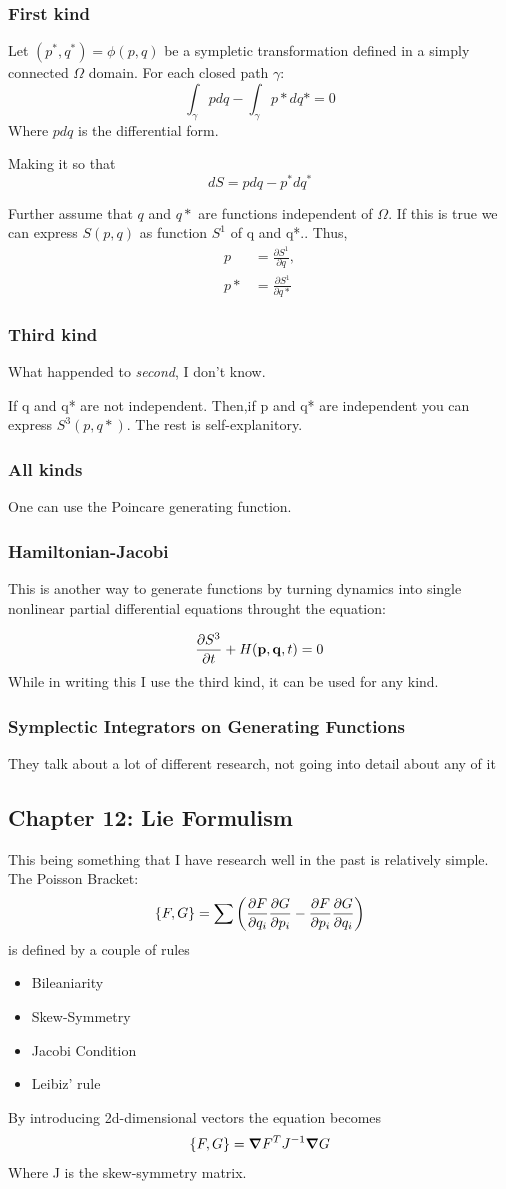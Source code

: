 \subsubsection{First kind}
Let $(p^*,q^*) = \phi(p, q)$ be a sympletic transformation defined in a simply connected $\Omega$ domain. For each closed path $\gamma$:
$$ \int_\gamma p dq-\int_\gamma p*dq* = 0$$
Where $pdq$ is the differential form.

Making it so that
$$ dS= pdq - p^*dq^* $$

Further assume that $q$ and $q*$ are functions independent of $\Omega$. If this is true we can express $S(p, q) $ as function $S^1$ of q and q*.. Thus,
\begin{align}
p &= \frac{\partial S^1}{\partial q}, \\
p* &= \frac{\partial S^1}{\partial q*}
\end{align} 

\subsubsection{Third kind}
What happended to \emph{second}, I don't know.

If q and q* are not independent. Then,if p and q* are independent you can express $S^3(p, q*)$. The rest is self-explanitory.

\subsubsection{All kinds}
One can use the Poincare generating function.
\subsubsection{Hamiltonian-Jacobi}
This is another way to generate functions by turning dynamics into single nonlinear partial differential equations throught the equation:

\[
\pdv{S^3}{t}(\mathbf{p}, \mathbf{q^{*}}, t)+H(\mathbf{p}, \mathbf{q}, t) = 0
\]
While in writing this I use the third kind, it can be used for any kind.
\subsubsection{Symplectic Integrators on Generating Functions}
They talk about a lot of different research, not going into detail about any of it

\subsection{Chapter 12: Lie Formulism}
This being something that I have research well in the past is relatively simple. The Poisson Bracket:
\[
\{F,G \}= \sum \left(\frac{\partial F}{\partial q_i}\frac{\partial G}{\partial p_i} - \frac{\partial F}{\partial p_i} \frac{\partial G}{\partial q_i} \right)
\]
is defined by a couple of rules
\begin{itemize}
    \item Bileaniarity
    \item Skew-Symmetry
    \item Jacobi Condition
    \item Leibiz' rule
\end{itemize}
By introducing 2d-dimensional vectors the equation becomes
\[
\pb{F}{G}= \grad{F^T}J^{-1} \grad{G}
\]
Where J is the skew-symmetry matrix.

